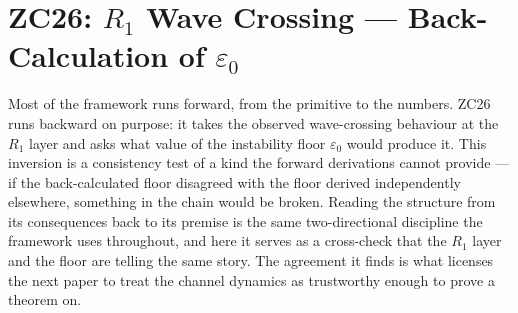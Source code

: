 \documentclass[12pt, a4paper]{article}
\begin{document}
\bigskip


\section{ZC26: $R_1$ Wave Crossing --- Back-Calculation of $\varepsilon_0$}
\label{sec:zc26-wave-crossing}

Most of the framework runs forward, from the primitive to the numbers. ZC26 runs
backward on purpose: it takes the observed wave-crossing behaviour at the $R_1$
layer and asks what value of the instability floor $\varepsilon_0$ would produce
it. This inversion is a consistency test of a kind the forward derivations cannot
provide --- if the back-calculated floor disagreed with the floor derived
independently elsewhere, something in the chain would be broken. Reading the
structure from its consequences back to its premise is the same two-directional
discipline the framework uses throughout, and here it serves as a cross-check
that the $R_1$ layer and the floor are telling the same story. The agreement it
finds is what licenses the next paper to treat the channel dynamics as
trustworthy enough to prove a theorem on.

\end{document}
